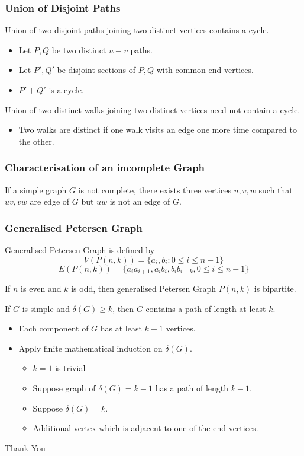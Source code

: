 \documentclass{beamer}
\begin{document}
\begin{frame}
\frametitle{Union of Disjoint Paths}
	Union of two disjoint paths joining two distinct vertices contains a cycle.
\begin{itemize}
	\item Let $P,Q$ be two distinct $u-v$ paths.
	\item Let $P', Q'$ be disjoint sections of $P,Q$ with common end vertices.
	\item $P'+Q'$ is a cycle.
\end{itemize}
	Union of two distinct walks joining two distinct vertices need not contain a cycle.
\begin{itemize}
	\item Two walks are distinct if one walk visits an edge one more time compared to the other.
\end{itemize}
\end{frame}

\begin{frame}
\frametitle{Characterisation of an incomplete Graph}
		If a simple graph $G$ is not complete, there exists three vertices $u,v,w$ such that $uv,vw$ are edge of $G$ but $uw$ is not an edge of $G$.
\end{frame}

\begin{frame}
\frametitle{Generalised Petersen Graph}
	\begin{definition}
	Generalised Petersen Graph is defined by
		$$ V(P(n,k)) = \{ a_i,b_i : 0 \le i \le n-1 \}  $$
		$$ E(P(n,k)) = \{ a_ia_{i+1}, a_ib_i, b_ib_{i+k}, 0 \le i \le n-1 \} $$
	\end{definition}
	
		If $n$ is even and $k$ is odd, then generalised Petersen Graph $P(n,k)$ is bipartite.
\end{frame}

\begin{frame}
		If $G$ is simple and $\delta(G) \ge k$, then $G$ contains a path of length at least $k$.
\begin{itemize}
	\item Each component of $G$ has at least $k+1$ vertices.
	\item Apply finite mathematical induction on $\delta(G)$.
	\begin{itemize}
		\item $k =1$ is trivial
		\item Suppose graph of $\delta(G) = k-1$ has a path of length $k-1$.
		\item Suppose $\delta(G) = k$.
		\item Additional vertex which is  adjacent to one of the end vertices.
	\end{itemize}
\end{itemize}
\end{frame}

\begin{frame}
	\vspace{0.6in}
	\hspace{3cm} {\color{blue}\Huge{Thank You}}
\end{frame}
\end{document}
